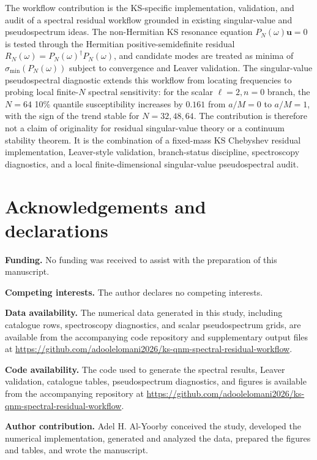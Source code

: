 ﻿\documentclass[12pt,a4paper]{article}
\begin{document}
The workflow contribution is the KS-specific implementation, validation, and audit of a spectral residual workflow grounded in existing singular-value and pseudospectrum ideas. The non-Hermitian KS resonance equation \(P_N(\omega)\bm{u}=0\) is tested through the Hermitian positive-semidefinite residual \(R_N(\omega)=P_N(\omega)^\dagger P_N(\omega)\), and candidate modes are treated as minima of \(\sigma_{\min}(P_N(\omega))\) subject to convergence and Leaver validation. The singular-value pseudospectral diagnostic extends this workflow from locating frequencies to probing local finite-\(N\) spectral sensitivity: for the scalar \(\ell=2,n=0\) branch, the \(N=64\) 10\% quantile susceptibility increases by \(0.161\) from \(a/M=0\) to \(a/M=1\), with the sign of the trend stable for \(N=32,48,64\). The contribution is therefore not a claim of originality for residual singular-value theory or a continuum stability theorem. It is the combination of a fixed-mass KS Chebyshev residual implementation, Leaver-style validation, branch-status discipline, spectroscopy diagnostics, and a local finite-dimensional singular-value pseudospectral audit.

\section*{Acknowledgements and declarations}

\noindent\textbf{Funding.}
No funding was received to assist with the preparation of this manuscript.

\noindent\textbf{Competing interests.}
The author declares no competing interests.

\noindent\textbf{Data availability.}
The numerical data generated in this study, including catalogue rows, spectroscopy diagnostics, and scalar pseudospectrum grids, are available from the accompanying code repository and supplementary output files at \url{https://github.com/adoolelomani2026/ks-qnm-spectral-residual-workflow}.

\noindent\textbf{Code availability.}
The code used to generate the spectral results, Leaver validation, catalogue tables, pseudospectrum diagnostics, and figures is available from the accompanying repository at \url{https://github.com/adoolelomani2026/ks-qnm-spectral-residual-workflow}.

\noindent\textbf{Author contribution.}
Adel H. Al-Yoorby conceived the study, developed the numerical implementation, generated and analyzed the data, prepared the figures and tables, and wrote the manuscript.
\end{document}
